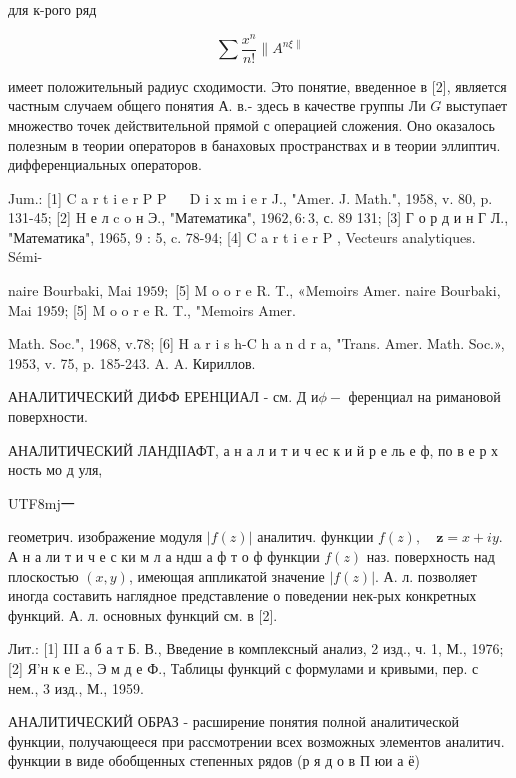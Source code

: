 \documentclass[10pt]{article}
\begin{document}
для к-рого ряд



\[

\sum \frac{x^{n}}{n !} \| A^{n \xi \|}

\]



имеет положительный радиус сходимости. Это понятие, введенное в [2], является частным случаем общего понятия А. в.- здесь в качестве группы Ли $G$ выступает множество точек действительной прямой с операцией сложения. Оно оказалось полезным в теории операторов в банаховых пространствах и в теории эллиптич. дифференциальных операторов.



Jum.: [1] C a r t i e r P P $\quad$ D i x m i e r J., "Amer. J. Math.", 1958, v. 80, p. 131-45; [2] H е л c o н Э., "Математика", $1962,6: 3$, с. 89 131; [3] Г о р д и н Г Л., "Математика", 1965, 9 : 5, c. 78-94; [4] C a r t i e r P , Vecteurs analytiques. Sémi-

naire Bourbaki, Mai $1959 ;$ [5] M o o r e R. T., «Memoirs Amer. naire Bourbaki, Mai 1959; [5] M o o r e R. T., "Memoirs Amer.

Math. Soc.", 1968, v.78; [6] H a r i s h-C h a n d r a, "Trans. Amer. Math. Soc.», 1953, v. 75, p. 185-243. A. A. Кириллов.



АНАЛИТИЧЕСКИЙ ДИФФ ЕРЕНЦИАЛ - см. Д $и \phi-$ ференциал на римановой поверхности.



АНАЛИТИЧЕСКИЙ ЛАНДІІАФТ, $а$ н а л и т и ч ес к и й р е ль е ф, по в е р х ность мо д уля,\begin{CJK}{UTF8}{mj}一\end{CJK} геометрич. изображение модуля $|f(z)|$ аналитич. функции $f(z), \quad \boldsymbol{z}=x+i y$. А н а ли т и ч е с ки м л а ндш а ф т о ф функции $f(z)$ наз. поверхность над плоскостью $(x, y)$, имеющая аппликатой значение $|f(z)|$. А. л. позволяет иногда составить наглядное представление о поведении нек-рых конкретных функций. А. л. основных функций см. в [2].



Лит.: [1] III а б а т Б. В., Введение в комплексный анализ, 2 изд., ч. 1, М., 1976; [2] Я'н к е E., Э м д е Ф., Таблицы функций с формулами и кривыми, пер. с нем., 3 изд., М., 1959.



АНАЛИТИЧЕСКИЙ ОБРАЗ - расширение понятия полной аналитической функции, получающееся при рассмотрении всех возможных элементов аналитич. функции в виде обобщенных степенных рядов (р я д о в П юи $а$ ё)
\end{document}
